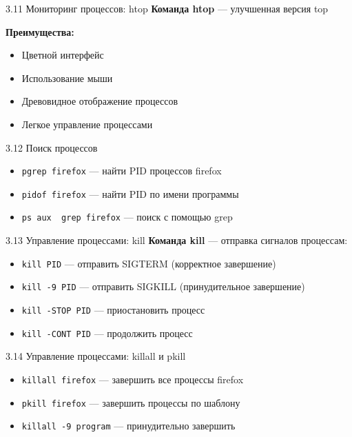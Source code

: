\documentclass[
  ignorenonframetext,
  aspectratio=169,
  russian,
]{beamer}
\providecommand{\tightlist}{%
  \setlength{\itemsep}{0pt}\setlength{\parskip}{0pt}}
\begin{document}
\begin{frame}{3.11 Мониторинг процессов: htop}
\label{ux43cux43eux43dux438ux442ux43eux440ux438ux43dux433-ux43fux440ux43eux446ux435ux441ux441ux43eux432-htop}
\textbf{Команда htop} --- улучшенная версия top

\textbf{Преимущества:}

\begin{itemize}[<+->]
\tightlist
\item
  Цветной интерфейс
\item
  Использование мыши
\item
  Древовидное отображение процессов
\item
  Легкое управление процессами
\end{itemize}
\end{frame}

\begin{frame}[fragile]{3.12 Поиск процессов}
\label{ux43fux43eux438ux441ux43a-ux43fux440ux43eux446ux435ux441ux441ux43eux432}
\begin{itemize}[<+->]
\tightlist
\item
  \texttt{pgrep\ firefox} --- найти PID процессов firefox
\item
  \texttt{pidof\ firefox} --- найти PID по имени программы
\item
  \texttt{ps\ aux\ \textbar{}\ grep\ firefox} --- поиск с помощью grep
\end{itemize}
\end{frame}

\begin{frame}[fragile]{3.13 Управление процессами: kill}
\label{ux443ux43fux440ux430ux432ux43bux435ux43dux438ux435-ux43fux440ux43eux446ux435ux441ux441ux430ux43cux438-kill}
\textbf{Команда kill} --- отправка сигналов процессам:

\begin{itemize}[<+->]
\tightlist
\item
  \texttt{kill\ PID} --- отправить SIGTERM (корректное завершение)
\item
  \texttt{kill\ -9\ PID} --- отправить SIGKILL (принудительное
  завершение)
\item
  \texttt{kill\ -STOP\ PID} --- приостановить процесс
\item
  \texttt{kill\ -CONT\ PID} --- продолжить процесс
\end{itemize}
\end{frame}

\begin{frame}[fragile]{3.14 Управление процессами: killall и pkill}
\label{ux443ux43fux440ux430ux432ux43bux435ux43dux438ux435-ux43fux440ux43eux446ux435ux441ux441ux430ux43cux438-killall-ux438-pkill}
\begin{itemize}[<+->]
\tightlist
\item
  \texttt{killall\ firefox} --- завершить все процессы firefox
\item
  \texttt{pkill\ firefox} --- завершить процессы по шаблону
\item
  \texttt{killall\ -9\ program} --- принудительно завершить
\end{itemize}
\end{frame}
\end{document}
